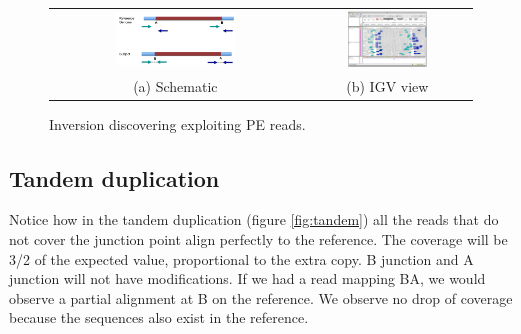 \begin{figure}[H]
\begin{tabular}{cc}
  \includegraphics[width=0.5\textwidth]{inversion.png} &   \includegraphics[width=0.5\textwidth]{inversion_igv.png} \\
(a) Schematic & (b) IGV view \\[6pt]

\end{tabular}
\caption{Inversion discovering exploiting PE reads.}
\label{fig:inversion}
\end{figure}



\subsection{Tandem duplication}
Notice how in the tandem duplication (figure \ref{fig:tandem}) all the reads that do not cover the junction point align perfectly to the reference.
The coverage will be 3/2 of the expected value, proportional to the extra copy. B junction and A junction will not have modifications. If we had a read mapping BA, we would observe a partial alignment at B on the reference.
We observe no drop of coverage because the sequences also exist in the reference. \\


